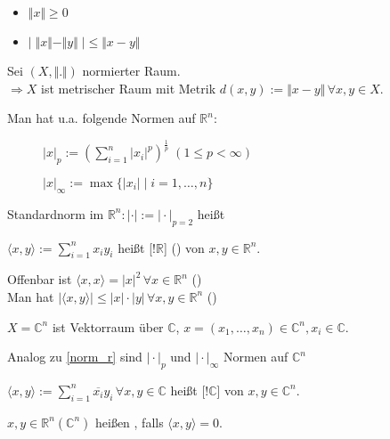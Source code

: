 \begin{conclusion}
	\begin{itemize}
		\item $\Vert x\Vert\ge 0$
		\item $\vert \; \Vert x\Vert - \Vert y\Vert \; \vert \leq \Vert x-y\Vert$
	\end{itemize}
\end{conclusion}

\begin{proposition}
	Sei $(X,\Vert .\Vert)$ normierter Raum.\\
	$\Rightarrow X$ ist metrischer Raum mit Metrik $d(x,y):=\Vert x - y \Vert\,\forall x,y\in X$.
\end{proposition}
\begin{example}
	\label{norm_r}
	Man hat u.a. folgende Normen auf $\mathbb{R}^n$:
	\begin{description}
		\item[] $\vert x\vert_p:=\left(\sum_{i=1}^n |x_i|^p\right)^\frac{1}{p}\;(1\le p<\infty)$
		\item[] $|x|_\infty :=\max\{|x_i| \mid i=1,\dots,n\}$
	\end{description}

	Standardnorm im $\mathbb{R}^n: \vert \cdot \vert:=\vert \cdot \vert_{p=2}$ heißt 
\end{example}
\begin{*definition}[Skalarprodukt]
	$\langle x,y\rangle:=\sum_{i=1}^n x_i y_i$ heißt [!$\mathbb{R}$] () von $x,y\in\mathbb{R}^n$.
	
	Offenbar ist $\langle x,x\rangle = |x|^2\,\forall x\in\mathbb{R}^n$ ()\\
	Man hat $|\langle x,y\rangle | \le |x|\cdot |y|\,\forall x,y\in\mathbb{R}^n$ ()
\end{*definition}
\begin{example}
	$X=\mathbb{C}^n$ ist Vektorraum über $\mathbb{C}$, $x=(x_1,\dotsc,x_n)\in\mathbb{C}^n, x_i\in\mathbb{C}$.
	
	Analog zu \ref{norm_r} sind $\vert\cdot\vert_p$ und $\vert\cdot\vert_\infty$ Normen auf $\mathbb{C}^n$
	
	$\langle x,y\rangle :=\sum_{i=1}^n \overline{x_i} y_i \,\forall x,y\in\mathbb{C}$ heißt [!$\mathbb{C}$] von $x,y\in\mathbb{C}^n$.
	
	$x,y\in\mathbb{R}^n (\mathbb{C}^n)$ heißen , falls $\langle x,y\rangle = 0$.
\end{example}
